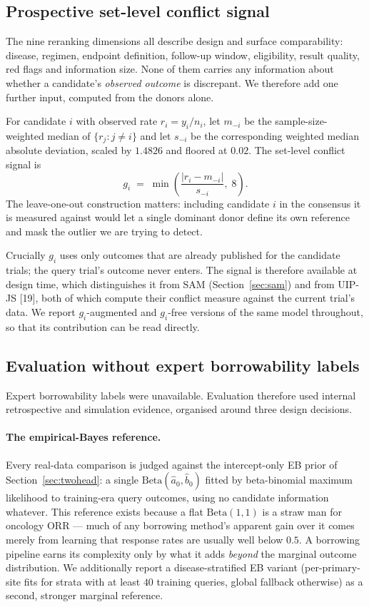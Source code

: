 \documentclass[11pt]{article}
\begin{document}
\subsection{Prospective set-level conflict signal}
\label{sec:prospective}
The nine reranking dimensions all describe design and surface comparability:
disease, regimen, endpoint definition, follow-up window, eligibility, result
quality, red flags and information size. None of them carries any information
about whether a candidate's \emph{observed outcome} is discrepant. We therefore
add one further input, computed from the donors alone.

For candidate $i$ with observed rate $r_i = y_i/n_i$, let $m_{-i}$ be the
sample-size-weighted median of $\{r_j : j \neq i\}$ and let $s_{-i}$ be the
corresponding weighted median absolute deviation, scaled by $1.4826$ and
floored at $0.02$. The set-level conflict signal is
\[
  g_i \;=\; \min\!\left(\frac{|r_i - m_{-i}|}{s_{-i}},\; 8\right).
\]
The leave-one-out construction matters: including candidate $i$ in the
consensus it is measured against would let a single dominant donor define its
own reference and mask the outlier we are trying to detect.

Crucially $g_i$ uses only outcomes that are already published for the candidate
trials; the query trial's outcome never enters. The signal is therefore
available at design time, which distinguishes it from SAM (Section~\ref{sec:sam}) and
from UIP-JS [19], both of which compute their conflict measure against the
current trial's data. We report $g_i$-augmented and $g_i$-free versions of the
same model throughout, so that its contribution can be read directly.

\subsection{Evaluation without expert borrowability labels}
\label{sec:eval}
Expert borrowability labels were unavailable. Evaluation therefore used
internal retrospective and simulation evidence, organised around three design
decisions.

\paragraph{The empirical-Bayes reference.} Every real-data comparison is
judged against the intercept-only EB prior of Section~\ref{sec:twohead}: a
single $\mathrm{Beta}(\hat a_0,\hat b_0)$ fitted by beta-binomial maximum
likelihood to training-era query outcomes, using no candidate information
whatever. This reference exists because a flat $\mathrm{Beta}(1,1)$ is a straw
man for oncology ORR --- much of any borrowing method's apparent gain over it
comes merely from learning that response rates are usually well below $0.5$.
A borrowing pipeline earns its complexity only by what it adds \emph{beyond}
the marginal outcome distribution. We additionally report a
disease-stratified EB variant (per-primary-site fits for strata with at least
$40$ training queries, global fallback otherwise) as a second, stronger
marginal reference.
\end{document}
